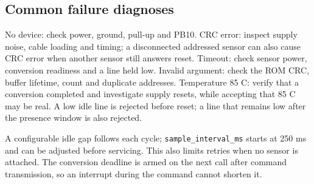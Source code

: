 \subsection{Common failure diagnoses}
No device: check power, ground, pull-up and PB10. CRC error: inspect supply noise,
cable loading and timing; a disconnected addressed sensor can also cause CRC
error when another sensor still answers reset. Timeout: check sensor power,
conversion readiness and a line held low. Invalid argument: check the ROM CRC,
buffer lifetime, count and duplicate addresses. Temperature 85 C: verify that a
conversion completed and investigate supply resets, while accepting that 85 C
may be real. A low idle line is rejected before reset; a line that remains low
after the presence window is also rejected.

A configurable idle gap follows each cycle; \texttt{sample\_interval\_ms}
starts at 250 ms and can be adjusted before servicing. This also limits retries
when no sensor is attached. The conversion deadline is armed on the next call
after command transmission, so an interrupt during the command cannot shorten it.
